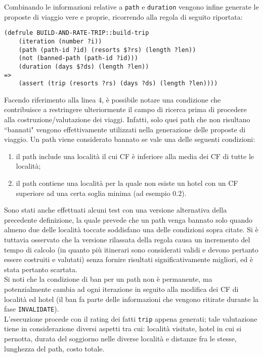 Combinando le informazioni relative a \texttt{path} e \texttt{duration} vengono infine generate le proposte di viaggio vere e proprie, ricorrendo alla regola di seguito riportata:

\begin{lstlisting}[frame=single]
(defrule BUILD-AND-RATE-TRIP::build-trip
    (iteration (number ?i))
    (path (path-id ?id) (resorts $?rs) (length ?len))
    (not (banned-path (path-id ?id)))
    (duration (days $?ds) (length ?len))
=>
    (assert (trip (resorts ?rs) (days ?ds) (length ?len))))
\end{lstlisting} 


Facendo riferimento alla linea 4, è possibile notare una condizione che contribuisce a restringere ulteriormente il campo di ricerca prima di procedere alla costruzione/valutazione dei viaggi. Infatti, solo quei path che non risultano ``bannati" vengono effettivamente utilizzati nella generazione delle proposte di viaggio. Un path viene considerato bannato se vale una delle seguenti condizioni:

\begin{enumerate}
\item il path include una località il cui CF è inferiore alla media dei CF di tutte le località;
\item il path contiene una località per la quale non esiste un hotel con un CF superiore ad una certa soglia minima (ad esempio $0.2$).
\end{enumerate}

Sono stati anche effettuati alcuni test con una versione alternativa della precedente definizione, la quale prevede che un path venga bannato solo quando almeno due delle località toccate soddisfano una delle condizioni sopra citate. Si è tuttavia osservato che la versione rilassata della regola causa un incremento del tempo di calcolo (in quanto più itinerari sono considerati validi e devono pertanto essere costruiti e valutati) senza fornire risultati significativamente migliori, ed è stata pertanto scartata. \\
Si noti che la condizione di ban per un path non è permanente, ma potenzialmente cambia ad ogni iterazione in seguito alla modifica dei CF di località ed hotel (il ban fa parte delle informazioni che vengono ritirate durante la fase \texttt{INVALIDATE}). \\
L'esecuzione procede con il rating dei fatti \texttt{trip} appena generati; tale valutazione tiene in considerazione diversi aspetti tra cui: località visitate, hotel in cui si pernotta, durata del soggiorno nelle diverse località e distanze fra le stesse, lunghezza del path, costo totale.

